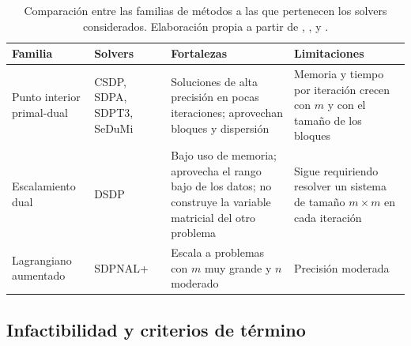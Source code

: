 \begin{table}[H]
    \centering
    \small
    \renewcommand{\arraystretch}{1.25}
    \begin{tabularx}{\textwidth}{>{\raggedright\arraybackslash}p{2.6cm}
                                 >{\raggedright\arraybackslash}p{2.1cm}
                                 >{\raggedright\arraybackslash}X
                                 >{\raggedright\arraybackslash}X}
        \toprule
        Familia & Solvers & Fortalezas & Limitaciones \\
        \midrule
        Punto interior primal-dual & CSDP, SDPA, SDPT3, SeDuMi
            & Soluciones de alta precisión en pocas iteraciones; aprovechan bloques y dispersión
            & Memoria y tiempo por iteración crecen con $m$ y con el tamaño de los bloques \\
        Escalamiento dual & DSDP
            & Bajo uso de memoria; aprovecha el rango bajo de los datos; no construye la variable
              matricial del otro problema
            & Sigue requiriendo resolver un sistema de tamaño $m \times m$ en cada iteración \\
        Lagrangiano aumentado & SDPNAL+
            & Escala a problemas con $m$ muy grande y $n$ moderado
            & Precisión moderada \\
        \bottomrule
    \end{tabularx}
    \caption[Comparación entre familias de métodos para programación semidefinida.]{Comparación
    entre las familias de métodos a las que pertenecen los solvers considerados. Elaboración
    propia a partir de \textcite{vandenbergheSemidefiniteProgramming1996},
    \textcite{mittelmannIndependentBenchmarkingSDP2003a},
    \textcite{bensonAlgorithm875DSDP5software2008} y
    \textcite{zhaoNewtonCGAugmentedLagrangian2010a}.}
    \label{tab:sdp_familias}
\end{table}

\subsection{Infactibilidad y criterios de término}
\label{subsec:sdp_infactibilidad}

